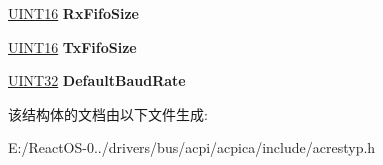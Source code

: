 \begin{DoxyCompactItemize}
\item 
\mbox{\label{structacpi__resource__uart__serialbus_a7add2dc26f7430df421cf59b9940722a}} 
\hyperlink{_processor_bind_8h_a09f1a1fb2293e33483cc8d44aefb1eb1}{U\+I\+N\+T16} {\bfseries Rx\+Fifo\+Size}
\item 
\mbox{\label{structacpi__resource__uart__serialbus_a0012143c6d3d07e5c6671e78d3fde9f9}} 
\hyperlink{_processor_bind_8h_a09f1a1fb2293e33483cc8d44aefb1eb1}{U\+I\+N\+T16} {\bfseries Tx\+Fifo\+Size}
\item 
\mbox{\label{structacpi__resource__uart__serialbus_aa5f32d6aa2846b8db6d2a471313fe63e}} 
\hyperlink{_processor_bind_8h_ae1e6edbbc26d6fbc71a90190d0266018}{U\+I\+N\+T32} {\bfseries Default\+Baud\+Rate}
\end{DoxyCompactItemize}


该结构体的文档由以下文件生成\+:\begin{DoxyCompactItemize}
\item 
E\+:/\+React\+O\+S-\/0../drivers/bus/acpi/acpica/include/acrestyp.\+h\end{DoxyCompactItemize}
